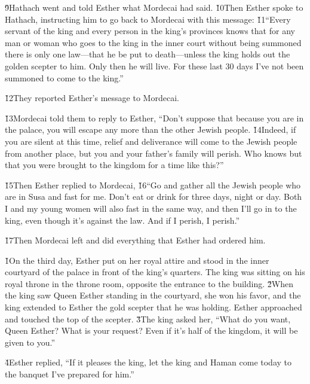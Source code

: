 \v{9}Hathach went and told Esther what Mordecai had said. \v{10}Then Esther spoke to Hathach, instructing him to go back to Mordecai with this message: \v{11}``Every servant of the king and every person in the king's provinces knows that for any man or woman who goes to the king in the inner court without being summoned there is only one law---that he be put to death---unless the king holds out the golden scepter to him. Only then he will live. For these last 30 days I've not been summoned to come to the king.''

\v{12}They reported Esther's message to Mordecai.

\v{13}Mordecai told them to reply to Esther, ``Don't suppose that because you are in the palace, you will escape any more than the other Jewish people. \v{14}Indeed, if you are silent at this time, relief and deliverance will come to the Jewish people from another place, but you and your father's family will perish. Who knows but that you were brought to the kingdom for a time like this?''

\v{15}Then Esther replied to Mordecai, \v{16}``Go and gather all the Jewish people who are in Susa and fast for me. Don't eat or drink for three days, night or day. Both I and my young women will also fast in the same way, and then I'll go in to the king, even though it's against the law. And if I perish, I perish.''

\v{17}Then Mordecai left and did everything that Esther had ordered him.

\v{1}On the third day, Esther put on her royal attire and stood in the inner courtyard of the palace in front of the king's quarters. The king was sitting on his royal throne in the throne room, opposite the entrance to the building. \v{2}When the king saw Queen Esther standing in the courtyard, she won his favor, and the king extended to Esther the gold scepter that he was holding. Esther approached and touched the top of the scepter. \v{3}The king asked her, ``What do you want, Queen Esther? What is your request? Even if it's half of the kingdom, it will be given to you.''

\v{4}Esther replied, ``If it pleases the king, let the king and Haman come today to the banquet I've prepared for him.''

